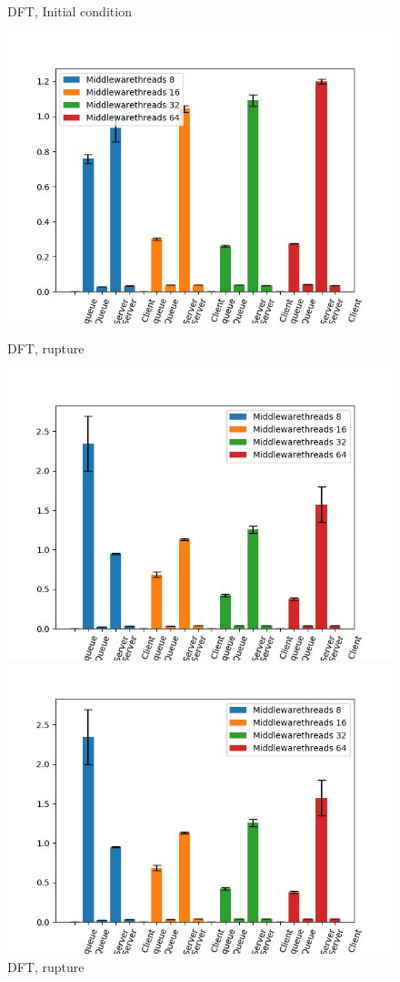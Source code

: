 \documentclass[11pt,a4paper]{article}
\begin{document}
\begin{figure}[!ht]
\begin{minipage}[b]{0.5\linewidth}
    \caption{DFT, Initial condition} 
    \vspace{4ex}
  \end{minipage}%
  \begin{minipage}[b]{0.5\linewidth}
    \centering
    \includegraphics[width=0.7\linewidth]{img/exp3_1/exp3_1_mw_percentile_plots_writes_1__vc_4.png} 
    \caption{DFT, rupture} 
    \vspace{4ex}
  \end{minipage} 
    \begin{minipage}[b]{0.5\linewidth}
    \centering
    \includegraphics[width=0.7\linewidth]{img/exp3_1/exp3_1_mw_percentile_plots_writes_1__vc_8.png} 
    \caption{DFT, rupture} 
    \vspace{4ex}
  \end{minipage} 
    \begin{minipage}[b]{0.5\linewidth}
    \centering
    \includegraphics[width=0.7\linewidth]{img/exp3_1/exp3_1_mw_percentile_plots_writes_1__vc_8.png} 

\end{minipage}
\end{figure}
\end{document}

